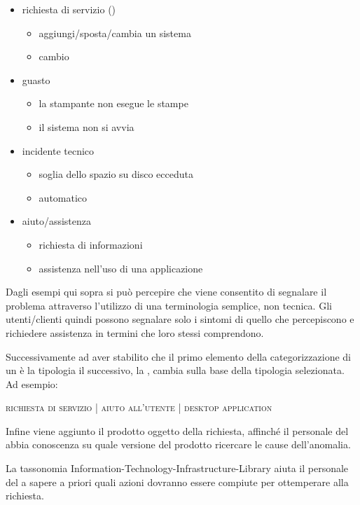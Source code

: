 \begin{itemize}
\item{richiesta di servizio ()}
\begin{itemize}
\item{aggiungi/sposta/cambia un sistema}
\item{cambio }
\end{itemize}
\item{guasto}
\begin{itemize}
\item{la stampante non esegue le stampe}
\item{il sistema non si avvia}
\end{itemize}
\item{incidente tecnico}
\begin{itemize}
\item{soglia dello spazio su disco ecceduta}
\item{ automatico}
\end{itemize}
\item{aiuto/assistenza}
\begin{itemize}
\item{richiesta di informazioni}
\item{assistenza nell'uso di una applicazione}
\end{itemize}
\end{itemize}

Dagli esempi qui sopra si può percepire che viene consentito di segnalare il problema attraverso l'utilizzo di una terminologia semplice, non tecnica. Gli utenti/clienti quindi possono segnalare solo i sintomi di quello che percepiscono e richiedere assistenza in termini che loro stessi comprendono.

Successivamente ad aver stabilito che il primo elemento della categorizzazione di un  è la tipologia il successivo, la , cambia sulla base della tipologia selezionata. Ad esempio:

\begin{center}
\textsc{richiesta di servizio | aiuto all'utente | desktop application}
\end{center}

Infine viene aggiunto il prodotto oggetto della richiesta, affinché il personale del  abbia conoscenza su quale versione del prodotto ricercare le cause dell'anomalia.

La tassonomia \ac{Information-Technology-Infrastructure-Library} aiuta il personale del  a sapere a priori quali azioni dovranno essere compiute per ottemperare alla richiesta.